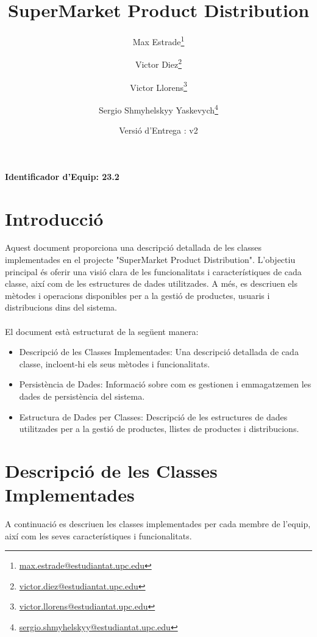 \documentclass[a4paper, t]{article}
\title{SuperMarket Product Distribution}
\author{
    Max Estrade\thanks{\href{mailto:max.estrade@estudiantat.upc.edu}{max.estrade@estudiantat.upc.edu}} \and
    Victor Diez\thanks{\href{mailto:victor.diez@estudiantat.upc.edu}{victor.diez@estudiantat.upc.edu}} \and
    Victor Llorens\thanks{\href{mailto:victor.llorens@estudiantat.upc.edu}{victor.llorens@estudiantat.upc.edu}} \and
    Sergio Shmyhelskyy Yaskevych\thanks{\href{mailto:sergio.shmyhelskyy@estudiantat.upc.edu}{sergio.shmyhelskyy@estudiantat.upc.edu}}
}
\date{Versió d'Entrega : v2}
\begin{document}
\maketitle

\vspace{1cm}  %

\begin{center}
    \textbf{Identificador d'Equip: 23.2}
\end{center}

\newpage

\tableofcontents

\newpage

\section{Introducció}

Aquest document proporciona una descripció detallada de les classes implementades en el projecte "SuperMarket Product Distribution". 
L'objectiu principal és oferir una visió clara de les funcionalitats i característiques de cada classe, 
així com de les estructures de dades utilitzades. A més, es descriuen els mètodes i operacions disponibles 
per a la gestió de productes, usuaris i distribucions dins del sistema.
\\ \\
\noindent El document està estructurat de la següent manera:
\begin{itemize}
    \item Descripció de les Classes Implementades: Una descripció detallada de cada classe, incloent-hi els seus mètodes i funcionalitats.
    \item Persistència de Dades: Informació sobre com es gestionen i emmagatzemen les dades de persistència del sistema.
    \item Estructura de Dades per Classes: Descripció de les estructures de dades utilitzades per a la gestió de productes, llistes de productes i distribucions.
\end{itemize}

\newpage

\section{Descripció de les Classes Implementades}

A continuació es descriuen les classes implementades per cada membre de l’equip, així com les seves característiques i funcionalitats.
\end{document}
